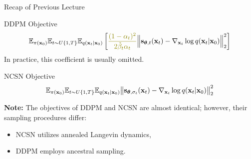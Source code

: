 \documentclass{beamer}
\begin{document}
\begin{frame}
\titlepage
\end{frame}
\begin{frame}{Recap of Previous Lecture}
	\begin{block}{DDPM Objective}
		\vspace{-0.5cm}
		\[
			\bbE_{\pi(\bx_0)} \bbE_{t \sim U\{1, T\}}\bbE_{q(\bx_t | \bx_0)} \left[ {\color{olive}\frac{(1 - \alpha_t)^2}{2\tilde{\beta}_t \alpha_t}} \Bigl\|  \bs_{\btheta, t} (\bx_t) - \nabla_{\bx_t} \log q(\bx_t | \bx_0) \Bigr\|_2^2  \right]
		\]
		In practice, {\color{olive}this coefficient} is usually omitted.
	\end{block}
	\begin{block}{NCSN Objective}
		\vspace{-0.3cm}
		\[
			\mathbb{E}_{\pi(\mathbf{x}_0)} \mathbb{E}_{t \sim U\{1, T\}} \mathbb{E}_{q(\mathbf{x}_t | \mathbf{x}_0)}\bigl\| \mathbf{s}_{\boldsymbol{\theta}, \sigma_t}(\mathbf{x}_t) - \nabla_{\mathbf{x}_t} \log q(\mathbf{x}_t | \mathbf{x}_0) \bigr\|^2_2 
		\]
		\vspace{-0.3cm}
	\end{block}
	\textbf{Note:} The objectives of DDPM and NCSN are almost identical; however, their sampling procedures differ:
	\begin{itemize}
		\item NCSN utilizes annealed Langevin dynamics,
		\item DDPM employs ancestral sampling.
	\end{itemize}
\end{frame}
\end{document}
